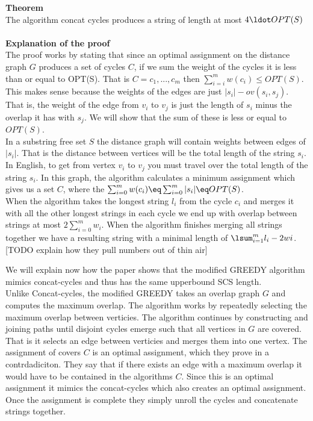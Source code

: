 \documentclass[letterpaper,11pt,titlepage]{article}
\begin{document}
\textbf{Theorem}\\
The algorithm concat cycles produces a string of length at most $4\ldot OPT(S)$\\\\

\textbf{Explanation of the proof}\\

The proof works by stating that since an optimal assignment on the distance graph $G$ produces a set of cycles $C$, if we sum the weight of the cycles it is less than or equal to OPT(S). That is $C = {c_1, ..., c_m}$ then $\sum_{i=i}^m w(c_i) \leq OPT(S)$.\\
This makes sense because the weights of the edges are just $|s_i| - ov(s_i,s_j)$. That is, the weight of the edge from $v_i$ to $v_j$ is just the length of $s_i$ minus the overlap it has with $s_j$. We will show that the sum of these is less or equal to $OPT(S)$.\\

In a substring free set $S$ the distance graph will contain weights between edges of $|s_i|$. That is the distance between vertices will be the total length of the string $s_i$. In English, to get from vertex $v_i$ to $v_j$ you must travel over the total length of the string $s_i$. In this graph, the algorithm calculates a minimum assignment which gives us a set $C$, where the  $\sum_{i=0}^m w(c_i) \eq \sum_{i=0}^m |s_i| \eq OPT(S)$.\\

When the algorithm takes the longest string $l_i$ from the cycle $c_i$ and merges it with all the other longest strings in each cycle we end up with overlap between strings at most $2\sum_{i=0}^m w_i$. When the algorithm finishes merging all strings together we have a resulting string with a minimal length of $\lsum_{i=1}^m l_i - 2wi$. [TODO explain how they pull numbers out of thin air]

We will explain now how the paper shows that the modified GREEDY algorithm mimics concat-cycles and thus has the same upperbound SCS length.\\

Unlike Concat-cycles, the modified GREEDY takes an overlap graph $G$ and computes the maximum overlap. The algorithm works by repeatedly selecting the maximum overlap between verticies. The algorithm continues by constructing and joining paths until disjoint cycles emerge such that all vertices in $G$ are covered. That is it selects an edge between verticies and merges them into one vertex. The assignment of covers $C$ is an optimal assignment, which they prove in a contrdadiciton. They say that if there exists an edge with a maximum overlap it would have to be contained in the algorithms $C$. Since this is an optimal assignment it mimics the concat-cycles which also creates an optimal assignment. Once the assignment is complete they simply unroll the cycles and concatenate strings together. 
\end{document}

